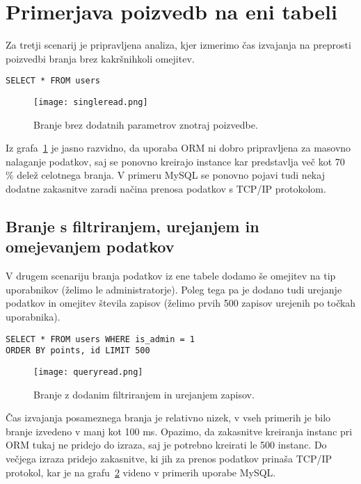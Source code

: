 \documentclass[a4paper,12pt,openright]{book}
\begin{document}
    \section{Primerjava poizvedb na eni tabeli}

    Za tretji scenarij je pripravljena analiza, kjer izmerimo čas izvajanja na preprosti poizvedbi branja brez kakršnihkoli omejitev.
    
\begin{verbatim}
SELECT * FROM users
\end{verbatim}
    

    \begin{figure}[H]
        \centerline{\texttt{[image: singleread.png]}}
        \caption{Branje brez dodatnih parametrov znotraj poizvedbe.}
        \label{branje}
    \end{figure}

    \noindent
    Iz grafa~\ref{branje} je jasno razvidno, da uporaba ORM ni dobro pripravljena za masovno nalaganje podatkov, saj se ponovno kreirajo instance kar predstavlja več kot 70 \% delež celotnega branja. V primeru MySQL se ponovno pojavi tudi nekaj dodatne zakasnitve zaradi načina prenosa podatkov s TCP/IP protokolom.

    \subsection{Branje s filtriranjem, urejanjem in omejevanjem podatkov}

    V drugem scenariju branja podatkov iz ene tabele dodamo še omejitev na tip uporabnikov (želimo le administratorje). Poleg tega pa je dodano tudi urejanje podatkov in omejitev števila zapisov (želimo prvih 500 zapisov urejenih po točkah uporabnika).

\begin{verbatim}
SELECT * FROM users WHERE is_admin = 1
ORDER BY points, id LIMIT 500
\end{verbatim}
    
    \begin{figure}[H]
        \centerline{\texttt{[image: queryread.png]}}
        \caption{Branje z dodanim filtriranjem in urejanjem zapisov.}
        \label{queryread}
    \end{figure}

    \noindent
    Čas izvajanja posameznega branja je relativno nizek, v vseh primerih je bilo branje izvedeno v manj kot 100 ms. Opazimo, da zakasnitve kreiranja instanc pri ORM tukaj ne pridejo do izraza, saj je potrebno kreirati le 500 instanc. Do večjega izraza pridejo zakasnitve, ki jih za prenos podatkov prinaša TCP/IP protokol, kar je na grafu~\ref{queryread} videno v primerih uporabe MySQL.
\end{document}
